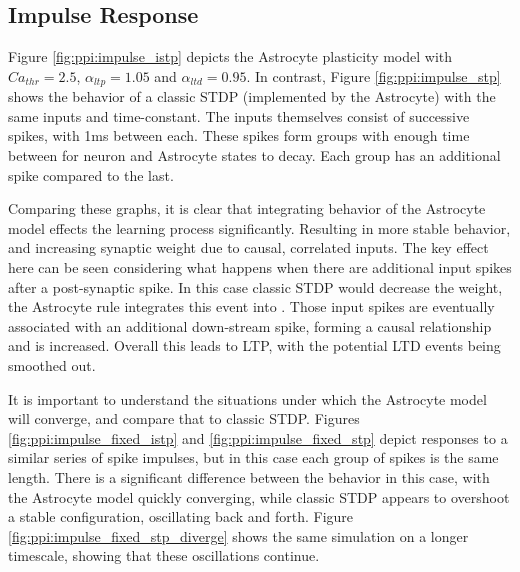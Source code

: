 \subsection{Impulse Response}
Figure \ref{fig:ppi:impulse_istp} depicts the Astrocyte plasticity model with
$Ca_{thr}=2.5$, $\alpha_{ltp}=1.05$ and $\alpha_{ltd}=0.95$. In contrast, Figure
\ref{fig:ppi:impulse_stp} shows the behavior of a classic STDP (implemented by
the Astrocyte) with the same inputs and time-constant. The inputs themselves
consist of successive spikes, with 1ms between each. These spikes form groups
with enough time between for neuron and Astrocyte states to decay. Each group
has an additional spike compared to the last.

Comparing these graphs, it is clear that integrating
behavior of the Astrocyte model effects the learning process
significantly. Resulting in more stable behavior, and increasing synaptic weight
due to causal, correlated inputs. The key effect here can be seen considering
what happens when there are additional input spikes after a post-synaptic
spike. In this case classic STDP would decrease the weight, the Astrocyte rule
integrates this event into \ca. Those input spikes are eventually associated
with an additional down-stream spike, forming a causal relationship and \ca is
increased. Overall this leads to LTP, with the potential LTD events being
smoothed out.



It is important to understand the situations under which the Astrocyte model
will converge, and compare that to classic STDP. Figures
\ref{fig:ppi:impulse_fixed_istp} and \ref{fig:ppi:impulse_fixed_stp} depict
responses to a similar series of spike impulses, but in this case each group of
spikes is the same length. There is a significant difference between the
behavior in this case, with the Astrocyte model quickly converging, while
classic STDP appears to overshoot a stable configuration, oscillating back and
forth. Figure \ref{fig:ppi:impulse_fixed_stp_diverge} shows the same simulation
on a longer timescale, showing that these oscillations continue.


